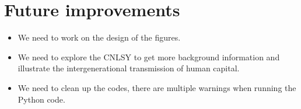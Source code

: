 \FloatBarrier\section{Future improvements}
\begin{itemize}
\item We need to work on the design of the figures.
\item We need to explore the CNLSY to get more background information and illustrate the intergenerational transmission of human capital.
\item We need to clean up the codes, there are multiple warnings when running the Python code.
\end{itemize}
